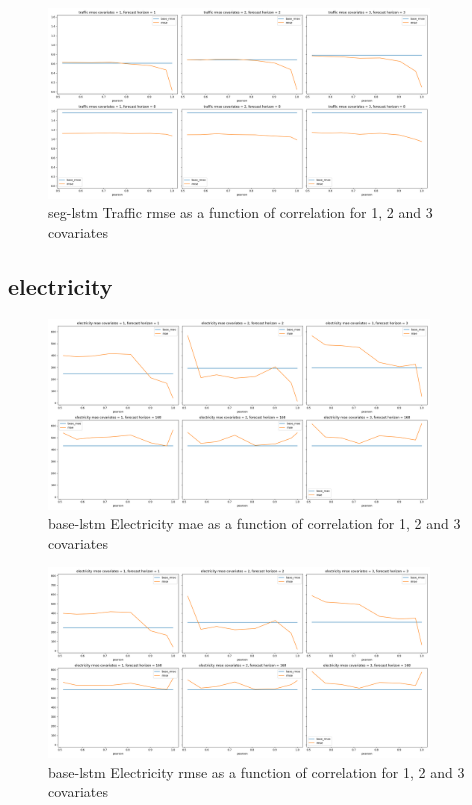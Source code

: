 \documentclass{article}
\begin{document}
  \begin{figure}[ht]
  \centering
  \includegraphics[width=0.9\textwidth]{figures/traffic-seg-lstm-rmse.png}
  \caption{seg-lstm Traffic rmse as a function of correlation for 1, 2 and 3 covariates}
  \label{fig:seg_lstm_traffic_rmse}
  \end{figure}

  \subsection{electricity}
  \begin{figure}[htbp]
  \centering
  \includegraphics[width=0.9\textwidth]{figures/electricity-base-lstm-mae.png}
  \caption{base-lstm Electricity mae as a function of correlation for 1, 2 and 3 covariates}
  \label{fig:base_lstm_electricity_mae}
  \end{figure}
  
  \begin{figure}[ht]
  \centering
  \includegraphics[width=0.9\textwidth]{figures/electricity-base-lstm-rmse.png}
  \caption{base-lstm Electricity rmse as a function of correlation for 1, 2 and 3 covariates}
  \label{fig:base_lstm_electricity_rmse}
  \end{figure}
    
\end{document}
